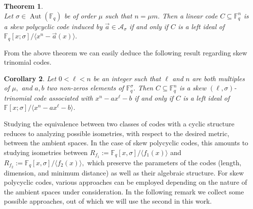 \documentclass[12pt,paper]{article}
\theoremstyle{plain}
\newtheorem{theorem}{Theorem}[section] %
\newtheorem{corollary}[theorem]{Corollary}
\newcommand{\Fq}{\mathbb{F}_{q}}
\DeclareMathOperator{\aut}{Aut}
\begin{document}

\begin{theorem}\cite[Theorem 5.9.]{Bag2025}\\
 Let $ \sigma \in \aut(\Fq)$ be of order $ \mu $ such that $ n = \mu m .$ Then a linear code $ C \subseteq \Fq^n$ is a skew polycyclic code induced by $ \vec{a} \in \mathcal{A}_{\sigma} $  if and only if $ C $ is a left ideal of $ \mathbb{F}_q[x; \sigma] / \langle x^n - \vec{a}(x) \rangle .$
\end{theorem}

From the above theorem we can easily deduce the following result regarding skew trinomial codes.

\begin{corollary}
Let $0<\ell<n$ be an integer such that $\ell$ and $n$ are both multiples of $\mu,$ and $a, b$ two non-zeros elements of $ \Fq^{\sigma}.$ Then $C\subseteq \Fq^n$ is a skew $(\ell,\sigma)$-trinomial code associated with $x^n-ax^{\ell}-b$  if and only if $ C $ is a left ideal of $ \mathbb{F}[x;\sigma]/\langle x^n-ax^{\ell}-b \rangle. $
\end{corollary}


Studying the equivalence between two classes of codes with a cyclic structure reduces to analyzing possible isometries, with respect to the desired metric, between the ambient spaces. In the case of skew polycyclic codes, this amounts to studying isometries between 
$
R_{f_1} := \mathbb{F}_q[x, \sigma]/ \langle f_1(x)\rangle $ and $ R_{f_2} := \mathbb{F}_q[x, \sigma]/\langle f_2(x)\rangle,
$
which preserve the parameters of the codes (length, dimension, and minimum distance) as well as their algebraic structure. For skew polycyclic codes, various approaches can be employed depending on the nature of the ambient spaces under consideration. In the following remark we collect some possible approaches, out of which we will use the second in this work.
\end{document}
